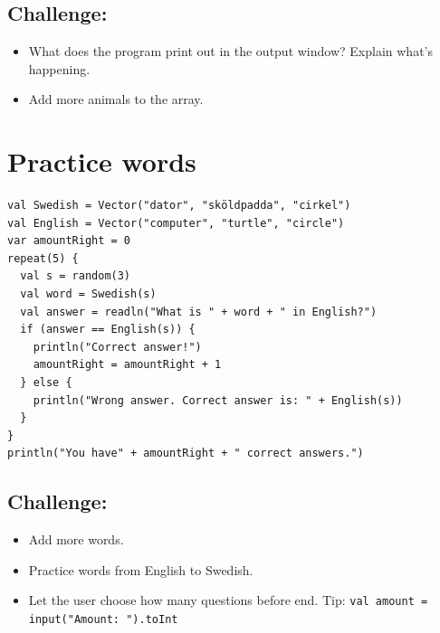 \section*{\color{BrickRed}Challenge:}


\begin{itemize}

\item {What does the program print out in the output window? Explain what's happening.}
\item {Add more animals to the array.}

\end{itemize}


\chapter{Practice words}
\begin{lstlisting}[basicstyle={\ttfamily\fontsize{14}{17}\selectfont},numbers=none]
val Swedish = Vector("dator", "sköldpadda", "cirkel")
val English = Vector("computer", "turtle", "circle")
var amountRight = 0
repeat(5) {
  val s = random(3)
  val word = Swedish(s)
  val answer = readln("What is " + word + " in English?")
  if (answer == English(s)) {
    println("Correct answer!")
    amountRight = amountRight + 1
  } else {
    println("Wrong answer. Correct answer is: " + English(s))
  }
}
println("You have" + amountRight + " correct answers.")
\end{lstlisting}
        
\section*{\color{BrickRed}Challenge:}


\begin{itemize}

\item {Add more words.}
\item {Practice words from English to Swedish.}
\item {Let the user choose how many questions before end. Tip: \lstinline{val amount = input("Amount: ").toInt} }

\end{itemize}


